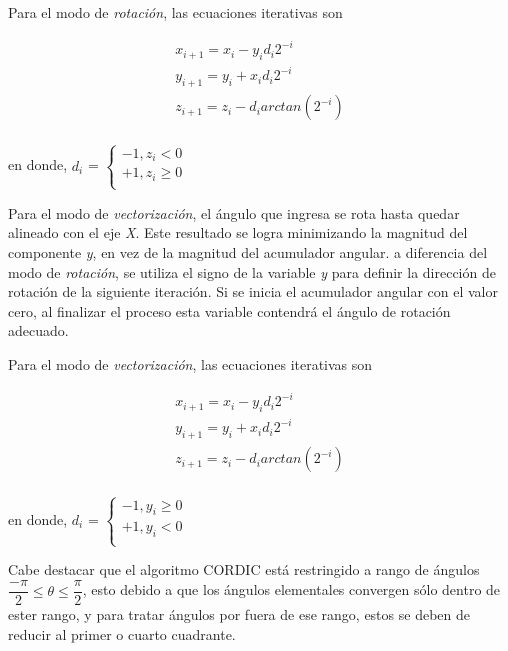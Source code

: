 Para el modo de \textit{rotación}, las ecuaciones iterativas son

\begin{equation}\label{eq:ec_rotacion}
\begin{array}{l}
     x_{i+1} = x_{i} - y_{i}d_{i}2^{-i}\\
     y_{i+1} = y_{i} + x_{i}d_{i}2^{-i}\\
     z_{i+1} = z_{i} - d_{i}arctan(2^{-i})\\
\end{array}
\end{equation}

en donde, $d_{i}$ = $\left\lbrace
\begin{array}{l}
     -1 ,z_{i} < 0\\
     +1 ,z_{i} \geqslant 0 \\
\end{array}
\right.$


Para el modo de \textit{vectorización}, el ángulo que ingresa se rota hasta quedar alineado con el eje \textit{X}. Este resultado se logra minimizando la magnitud del componente \textit{y}, en vez de la magnitud del acumulador angular. a diferencia del modo de \textit{rotación}, se utiliza el signo de la variable \textit{y} para definir la dirección de rotación de la siguiente iteración. Si se inicia el acumulador angular con el valor cero, al finalizar el proceso esta variable contendrá el ángulo de rotación adecuado.

Para el modo de \textit{vectorización}, las ecuaciones iterativas son

\begin{equation}\label{eq:ec_rotacion}
\begin{array}{l}
     x_{i+1} = x_{i} - y_{i}d_{i}2^{-i}\\
     y_{i+1} = y_{i} + x_{i}d_{i}2^{-i}\\
     z_{i+1} = z_{i} - d_{i}arctan(2^{-i})\\
\end{array}
\end{equation}

en donde, $d_{i}$ = $\left\lbrace
\begin{array}{l}
     -1 ,y_{i} \geqslant 0\\
     +1 ,y_{i} < 0 \\
\end{array}
\right.$

Cabe destacar que el algoritmo CORDIC está restringido a rango de ángulos $\dfrac{-\pi}{2} \leqslant \theta \leqslant \dfrac{\pi}{2}$, esto debido a que los ángulos elementales convergen sólo dentro de ester rango, y para tratar ángulos por fuera de ese rango, estos se deben de reducir al primer o cuarto cuadrante.

